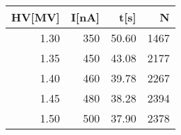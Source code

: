 \begin{tabular}{rrrr}
\toprule
 HV[MV] &  I[nA] &  t[s] &    N \\
\midrule
   1.30 &    350 & 50.60 & 1467 \\
   1.35 &    450 & 43.08 & 2177 \\
   1.40 &    460 & 39.78 & 2267 \\
   1.45 &    480 & 38.28 & 2394 \\
   1.50 &    500 & 37.90 & 2378 \\
\bottomrule
\end{tabular}
